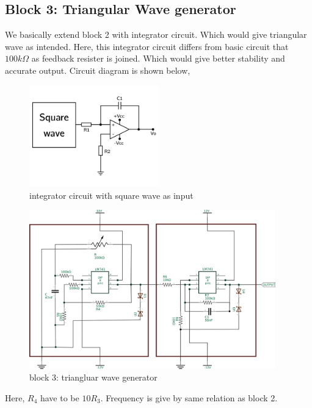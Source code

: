 \documentclass[14pt,a4paper]{extarticle}
\begin{document}
\subsection{Block 3: Triangular Wave generator}
\label{sec:org12e0f06}

We basically extend block 2 with integrator circuit. Which would give triangular wave as intended. Here, this integrator circuit differs from basic circuit that \(100k\Omega\) as feedback resister is joined. Which would give better stability and accurate output. Circuit diagram is shown below,


\begin{figure}[H]
    \centering
    \includegraphics[width=0.5\textwidth]{imgs/triang.png}
    \caption{integrator circuit with square wave as input}
    \label{fig:triang}
\end{figure}

\begin{figure}[H]
    \centering
    \includegraphics[width=0.95\textwidth]{imgs/triangreal.png}
    \caption{block 3: triangluar wave generator}
    \label{fig:tringularreal}
\end{figure}

Here, \(R_{4}\) have to be \(10R_{3}\). Frequency is give by same relation as block 2.
\end{document}
